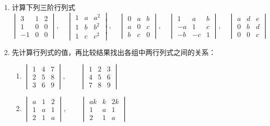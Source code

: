 \begin{ex}
\begin{enumerate}
\item 计算下列三阶行列式    
\[\begin{vmatrix}
    3&1&2\\1&0&0\\-1&0&0
\end{vmatrix},\quad \begin{vmatrix}
    1&a&a^2\\1&b&b^2\\1&c&c^2
\end{vmatrix},\quad \begin{vmatrix}
    0&a&b\\a&0&c\\b&c&0
\end{vmatrix},\quad \begin{vmatrix}
    1&a&b\\-a&1&c\\-b&-c&1
\end{vmatrix},\quad \begin{vmatrix}
    a&d&e\\0&b&d\\0&0&c
\end{vmatrix}\]

\item 先计算行列式的值，再比较结果找出各组中两行列式之间的关系：
\begin{enumerate}
    \item $\begin{vmatrix}
        1&4&7\\2&5&8\\3&6&9
    \end{vmatrix},\qquad \begin{vmatrix}
        1&2&3\\4&5&6\\7&8&9
    \end{vmatrix}$
    \item $\begin{vmatrix}
        a&1&2\\1&a&1\\2&1&a
    \end{vmatrix},\qquad \begin{vmatrix}
        ak&k&2k\\1&a&1\\2&1&a
    \end{vmatrix}$
\end{enumerate}
\end{enumerate}    
\end{ex}

